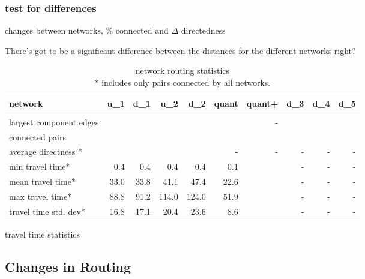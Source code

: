\subsubsection{test for differences}


\begin{table}
\centering
\caption{changes between networks, \% connected and $\Delta$ directedness}
\label{table:change between nets}
\end{table}

There's got to be a significant difference between the distances for the different networks right?


\begin{table}[]
\begin{tabular}{lrrrrrrrrr}
network                      & u\_1 & d\_1 & u\_2  & d\_2  & quant & quant+ & d\_3 & d\_4 & d\_5 \\ \hline
                             &      &      &       &       &       &        &      &      &      \\
largest component edges      &      &      &       &       &       & -      &      &      &      \\
connected pairs              &      &      &       &       &       &        &      &      &      \\
average directness *         &      &      &       &       & -     & -      & -    & -    & -    \\
min travel time*      & 0.4  & 0.4  & 0.4   & 0.4   & 0.1   &        & -    & -    & -    \\
mean travel time*     & 33.0 & 33.8 & 41.1  & 47.4  & 22.6  &        & -    & -    & -    \\
max travel time*      & 88.8 & 91.2 & 114.0 & 124.0 & 51.9  &        & -    & -    & -    \\
travel time std. dev* & 16.8 & 17.1 & 20.4  & 23.6  & 8.6   &        & -    & -    & -   
\end{tabular}
\caption[caption]{network routing statistics \\ $*$ includes only pairs connected by all networks.}
\label{table:travel_time_stats}
\end{table}

\begin{table}
\centering
\caption{travel time statistics}
\label{table:travel_time_stats}
\end{table}

\subsection{Changes in Routing}


